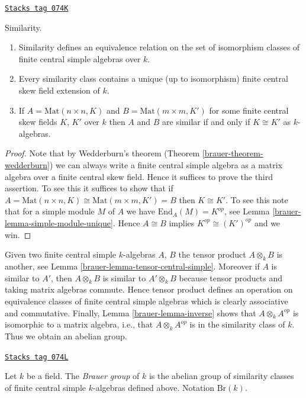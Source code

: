 \begin{lemma}[Similar]
\label{brauer-lemma-similar}
\href{https://stacks.math.columbia.edu/tag/074K}{\texttt{Stacks tag 074K}}

Similarity.
\begin{enumerate}
\item Similarity defines an equivalence relation on the set of isomorphism
classes of finite central simple algebras over $k$.
\item Every similarity class contains a unique (up to isomorphism)
finite central skew field extension of $k$.
\item If $A = \text{Mat}(n \times n, K)$ and $B = \text{Mat}(m \times m, K')$
for some finite central skew fields $K$, $K'$ over $k$
then $A$ and $B$ are similar if and only if $K \cong K'$ as $k$-algebras.
\end{enumerate}
\end{lemma}

\begin{proof}

Note that by Wedderburn's theorem (Theorem \ref{brauer-theorem-wedderburn})
we can always write a finite central simple algebra as a matrix
algebra over a finite central skew field. Hence it suffices to prove
the third assertion. To see this it suffices to show that if
$A = \text{Mat}(n \times n, K) \cong \text{Mat}(m \times m, K') = B$
then $K \cong K'$. To see this note that for a simple module $M$ of $A$
we have $\text{End}_A(M) = K^{op}$, see
Lemma \ref{brauer-lemma-simple-module-unique}.
Hence $A \cong B$ implies $K^{op} \cong (K')^{op}$ and we win.
\end{proof}

Given two finite central simple $k$-algebras $A$, $B$ the tensor
product $A \otimes_k B$ is another, see
Lemma \ref{brauer-lemma-tensor-central-simple}.
Moreover if $A$ is similar to $A'$, then $A \otimes_k B$ is similar
to $A' \otimes_k B$ because tensor products and taking matrix
algebras commute. Hence tensor product defines an operation on
equivalence classes of finite central simple algebras which is clearly
associative and commutative. Finally,
Lemma \ref{brauer-lemma-inverse}
shows that $A \otimes_k A^{op}$ is isomorphic to a matrix algebra, i.e.,
that $A \otimes_k A^{op}$ is in the similarity class of $k$.
Thus we obtain an abelian group.

\begin{definition}
\label{brauer-definition-brauer-group}
\href{https://stacks.math.columbia.edu/tag/074L}{\texttt{Stacks tag 074L}}

Let $k$ be a field. The {\it Brauer group} of $k$ is the abelian group
of similarity classes of finite central simple $k$-algebras defined
above. Notation $\text{Br}(k)$.
\end{definition}

